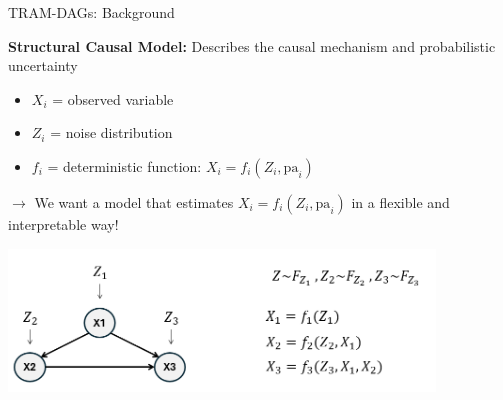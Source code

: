 \documentclass[onlytextwidth,english]{beamer}\usepackage[]{graphicx}\usepackage[]{xcolor}
\begin{document}
% 
% 
% 
% 
% 
% 
% 
\begin{frame}{TRAM-DAGs: Background}

\textbf{Structural Causal Model:} Describes the causal mechanism and probabilistic uncertainty

\vspace{0.2cm}

\begin{itemize}
    \item $X_i$ = observed variable
    \item $Z_i$ = noise distribution
    \item $f_i$ = deterministic function: $X_i = f_i(Z_i, \text{pa}_i)$
\end{itemize}

$\rightarrow$ We want a model that estimates $X_i = f_i(Z_i, \text{pa}_i)$ in a flexible and interpretable way!

\vfill

\centering
\includegraphics[width=0.85\textwidth]{img/SCM.png}



\end{frame}
\end{document}
